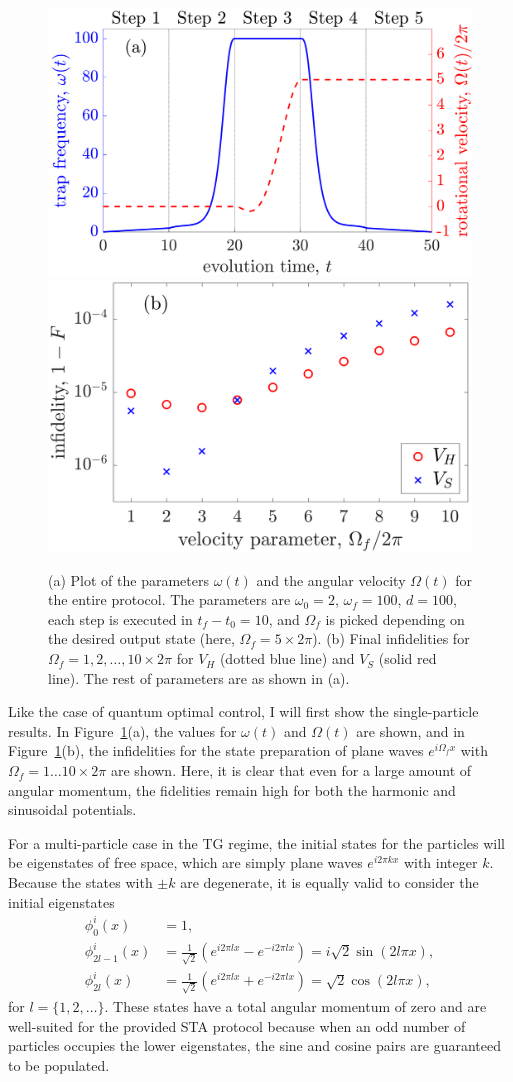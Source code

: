 \begin{figure}
\centering
\includegraphics[width=0.45\linewidth]{data/1d/fig5.png}
\includegraphics[width= 0.45\linewidth]{data/1d/fig6.png}
\caption{
(a) Plot of the parameters $\omega(t)$ and the angular velocity $\Omega(t)$ for the entire protocol.
The parameters are $\omega_0=2$, $\omega_f=100$, $d=100$, each step is executed in $t_f-t_0=10$, and $\Omega_f$ is picked depending on the desired output state (here, $\Omega_f=5 \times 2\pi$).
(b) Final infidelities for $\Omega_f=1,2,\ldots,10 \times 2\pi$ for $V_H$ (dotted blue line) and $V_S$ (solid red line).
The rest of parameters are as shown in (a).
}
\label{fig:final+param}
\end{figure}

Like the case of quantum optimal control, I will first show the single-particle results.
In Figure~\ref{fig:final+param}(a), the values for $\omega(t)$ and $\Omega(t)$ are shown, and
in Figure~\ref{fig:final+param}(b), the infidelities for the state preparation of plane waves $e^{i \Omega_f x}$ with $\Omega_f=1\ldots10 \times 2 \pi$ are shown.
Here, it is clear that even for a large amount of angular momentum, the fidelities remain high for both the harmonic and sinusoidal potentials.

For a multi-particle case in the TG regime, the initial states for the particles will be eigenstates of free space, which are simply plane waves $e^{i 2 \pi k x}$ with integer $k$.
Because the states with $\pm k$ are degenerate, it is equally valid to consider the initial eigenstates
\begin{align}
\phi^i_0(x)&=1,\\
\phi^i_{2l-1}(x)&=\frac{1}{\sqrt 2} \left( e^{i 2 \pi l x}-e^{-i 2 \pi l x} \right)= i \sqrt{2} \sin(2 l \pi x), \\
\phi^i_{2l}(x)&= \frac{1}{\sqrt 2}\left( e^{i 2 \pi l x}+e^{-i 2 \pi l x} \right) = \sqrt{2} \cos(2 l \pi x),
\end{align}
for $l=\{1,2,\ldots\}$.
These states have a total angular momentum of zero and are well-suited for the provided STA protocol because when an odd number of particles occupies the lower eigenstates, the sine and cosine pairs are guaranteed to be populated.

